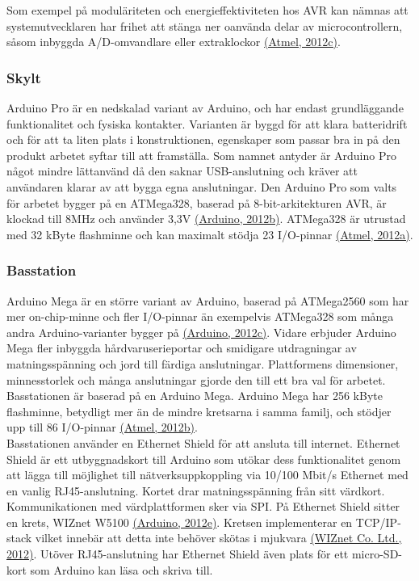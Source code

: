 \documentclass[a4paper,11pt]{article}
\begin{document}
Som exempel på moduläriteten och energieffektiviteten hos AVR kan nämnas att systemutvecklaren har frihet att stänga ner oanvända delar av microcontrollern, såsom inbyggda A/D-omvandlare eller extraklockor \hyperref[atmel]{(Atmel, 2012c)}.

\subsubsection{Skylt}
\label{skylt}
Arduino Pro är en nedskalad variant av Arduino, och har endast grundläggande funktionalitet och fysiska kontakter. Varianten är byggd för att klara batteridrift och för att ta liten plats i konstruktionen, egenskaper som passar bra in på den produkt arbetet syftar till att framställa. Som namnet antyder är Arduino Pro något mindre lättanvänd då den saknar USB-anslutning och kräver att användaren klarar av att bygga egna anslutningar. Den Arduino Pro som valts för arbetet bygger på en ATMega328, baserad på 8-bit-arkitekturen AVR, är klockad till 8MHz och använder 3,3V \hyperref[arduino]{(Arduino, 2012b)}. ATMega328 är utrustad med 32 kByte flashminne och kan maximalt stödja 23 I/O-pinnar \hyperref[atmel]{(Atmel, 2012a)}.

\subsubsection{Basstation}
Arduino Mega är en större variant av Arduino, baserad på ATMega2560 som har mer on-chip-minne och fler I/O-pinnar än exempelvis ATMega328 som många andra Arduino-varianter bygger på \hyperref[arduino]{(Arduino, 2012c)}. Vidare erbjuder Arduino Mega fler inbyggda hårdvaruserieportar och smidigare utdragningar av matningsspänning och jord till färdiga anslutningar. Plattformens dimensioner, minnesstorlek och många anslutningar gjorde den till ett bra val för arbetet. Basstationen är baserad på en Arduino Mega. Arduino Mega har 256 kByte flashminne, betydligt mer än de mindre kretsarna i samma familj, och stödjer upp till 86 I/O-pinnar \hyperref[atmel]{(Atmel, 2012b)}. \\

Basstationen använder en Ethernet Shield för att ansluta till internet. Ethernet Shield är ett utbyggnadskort till Arduino som utökar dess funktionalitet genom att lägga till möjlighet till nätverksuppkoppling via 10/100 Mbit/s Ethernet med en vanlig RJ45-anslutning. Kortet drar matningsspänning från sitt värdkort. Kommunikationen med värdplattformen sker via SPI. På Ethernet Shield sitter en krets, WIZnet W5100 \hyperref[arduino]{(Arduino, 2012e)}. Kretsen implementerar en TCP/IP-stack vilket innebär att detta inte behöver skötas i mjukvara \hyperref[wiznet]{(WIZnet Co. Ltd., 2012)}. Utöver RJ45-anslutning har Ethernet Shield även plats för ett micro-SD-kort som Arduino kan läsa och skriva till. \\
\end{document}
